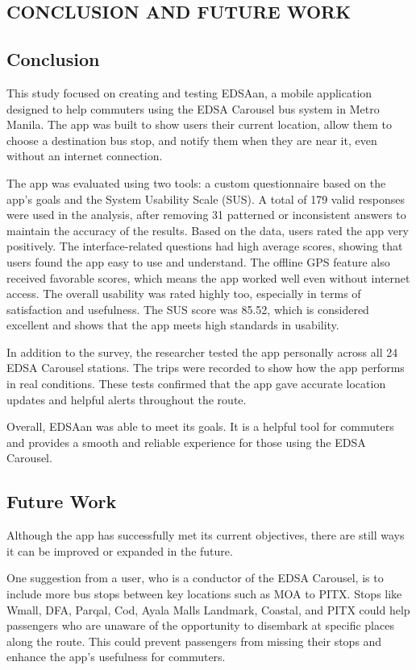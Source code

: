 \documentclass{icsthesis}
\begin{document}
\begin{mainmatter}
		\section{CONCLUSION AND FUTURE WORK}
\subsection{Conclusion}
This study focused on creating and testing EDSAan, a mobile application designed to help commuters using the EDSA Carousel bus system in Metro Manila. The app was built to show users their current location, allow them to choose a destination bus stop, and notify them when they are near it, even without an internet connection.

The app was evaluated using two tools: a custom questionnaire based on the app’s goals and the System Usability Scale (SUS). A total of 179 valid responses were used in the analysis, after removing 31 patterned or inconsistent answers to maintain the accuracy of the results. Based on the data, users rated the app very positively. The interface-related questions had high average scores, showing that users found the app easy to use and understand. The offline GPS feature also received favorable scores, which means the app worked well even without internet access. The overall usability was rated highly too, especially in terms of satisfaction and usefulness. The SUS score was 85.52, which is considered excellent and shows that the app meets high standards in usability.

In addition to the survey, the researcher tested the app personally across all 24 EDSA Carousel stations. The trips were recorded to show how the app performs in real conditions. These tests confirmed that the app gave accurate location updates and helpful alerts throughout the route.

Overall, EDSAan was able to meet its goals. It is a helpful tool for commuters and provides a smooth and reliable experience for those using the EDSA Carousel.

\subsection{Future Work}
Although the app has successfully met its current objectives, there are still ways it can be improved or expanded in the future.

One suggestion from a user, who is a conductor of the EDSA Carousel, is to include more bus stops between key locations such as MOA to PITX. Stops like Wmall, DFA, Parqal, Cod, Ayala Malls Landmark, Coastal, and PITX could help passengers who are unaware of the opportunity to disembark at specific places along the route. This could prevent passengers from missing their stops and enhance the app's usefulness for commuters.


\end{mainmatter}
\end{document}
